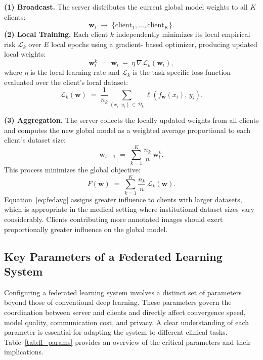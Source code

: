 \textbf{(1) Broadcast.} The server distributes the current global model
weights to all $K$ clients:
\begin{equation}
    \mathbf{w}_t \;\longrightarrow\; \{\text{client}_1, \dots, \text{client}_K\}.
\end{equation}
\textbf{(2) Local Training.} Each client $k$ independently minimizes its
local empirical risk $\mathcal{L}_k$ over $E$ local epochs using a gradient-
based optimizer, producing updated local weights:
\begin{equation}
    \mathbf{w}_t^k \;=\; \mathbf{w}_t \;-\; \eta\,\nabla\mathcal{L}_k(\mathbf{w}_t),
\end{equation}
where $\eta$ is the local learning rate and $\mathcal{L}_k$ is the
task-specific loss function evaluated over the client's local dataset:
\begin{equation}
    \mathcal{L}_k(\mathbf{w}) \;=\;
    \frac{1}{n_k}\sum_{(x_i,\,y_i)\,\in\,\mathcal{D}_k}
    \ell\!\left(f_{\mathbf{w}}(x_i),\,y_i\right).
\end{equation}
 
\textbf{(3) Aggregation.} The server collects the locally updated weights
from all clients and computes the new global model as a weighted average
proportional to each client's dataset size:
\begin{equation}
    \mathbf{w}_{t+1} \;=\; \sum_{k=1}^{K}\frac{n_k}{n}\,\mathbf{w}_t^k.
    \label{eq:fedavg}
\end{equation}
This process minimizes the global objective:
\begin{equation}
    F(\mathbf{w}) \;=\; \sum_{k=1}^{K}\frac{n_k}{n}\,\mathcal{L}_k(\mathbf{w}).
\end{equation}
Equation~\eqref{eq:fedavg} assigns greater influence to clients with larger
datasets, which is appropriate in the medical setting where institutional
dataset sizes vary considerably. Clients contributing more annotated images
should exert proportionally greater influence on the global model.
 
\subsection{Key Parameters of a Federated Learning System}
\label{subsec:fl_parameters}
 
Configuring a federated learning system involves a distinct set of
parameters beyond those of conventional deep learning. These parameters
govern the coordination between server and clients and directly affect
convergence speed, model quality, communication cost, and privacy. A clear
understanding of each parameter is essential for adapting the system to
different clinical tasks. Table~\ref{tab:fl_params} provides an overview
of the critical parameters and their implications.
 

